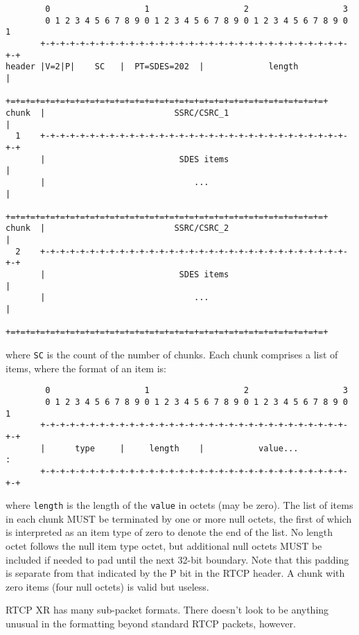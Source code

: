 \documentclass[10pt]{article}
\begin{document}
\footnotesize
\begin{verbatim}
        0                   1                   2                   3
        0 1 2 3 4 5 6 7 8 9 0 1 2 3 4 5 6 7 8 9 0 1 2 3 4 5 6 7 8 9 0 1
       +-+-+-+-+-+-+-+-+-+-+-+-+-+-+-+-+-+-+-+-+-+-+-+-+-+-+-+-+-+-+-+-+
header |V=2|P|    SC   |  PT=SDES=202  |             length            |
       +=+=+=+=+=+=+=+=+=+=+=+=+=+=+=+=+=+=+=+=+=+=+=+=+=+=+=+=+=+=+=+=+
chunk  |                          SSRC/CSRC_1                          |
  1    +-+-+-+-+-+-+-+-+-+-+-+-+-+-+-+-+-+-+-+-+-+-+-+-+-+-+-+-+-+-+-+-+
       |                           SDES items                          |
       |                              ...                              |
       +=+=+=+=+=+=+=+=+=+=+=+=+=+=+=+=+=+=+=+=+=+=+=+=+=+=+=+=+=+=+=+=+
chunk  |                          SSRC/CSRC_2                          |
  2    +-+-+-+-+-+-+-+-+-+-+-+-+-+-+-+-+-+-+-+-+-+-+-+-+-+-+-+-+-+-+-+-+
       |                           SDES items                          |
       |                              ...                              |
       +=+=+=+=+=+=+=+=+=+=+=+=+=+=+=+=+=+=+=+=+=+=+=+=+=+=+=+=+=+=+=+=+
\end{verbatim}
\normalsize

where \verb|SC| is the count of the number of chunks. Each chunk comprises
a list of items, where the format of an item is:
\footnotesize
\begin{verbatim}
        0                   1                   2                   3
        0 1 2 3 4 5 6 7 8 9 0 1 2 3 4 5 6 7 8 9 0 1 2 3 4 5 6 7 8 9 0 1
       +-+-+-+-+-+-+-+-+-+-+-+-+-+-+-+-+-+-+-+-+-+-+-+-+-+-+-+-+-+-+-+-+
       |      type     |     length    |           value...            :
       +-+-+-+-+-+-+-+-+-+-+-+-+-+-+-+-+-+-+-+-+-+-+-+-+-+-+-+-+-+-+-+-+
\end{verbatim}
\normalsize
where \verb|length| is the length of the \verb|value| in octets (may be
zero).  The list of items in each chunk MUST be terminated by one or more
null octets, the first of which is interpreted as an item type of zero to
denote the end of the list.  No length octet follows the null item type
octet, but additional null octets MUST be included if needed to pad until
the next 32-bit boundary.  Note that this padding is separate from that
indicated by the P bit in the RTCP header.  A chunk with zero items (four
null octets) is valid but useless.

RTCP XR has many sub-packet formats. There doesn't look to be anything
unusual in the formatting beyond standard RTCP packets, however.
\end{document}
